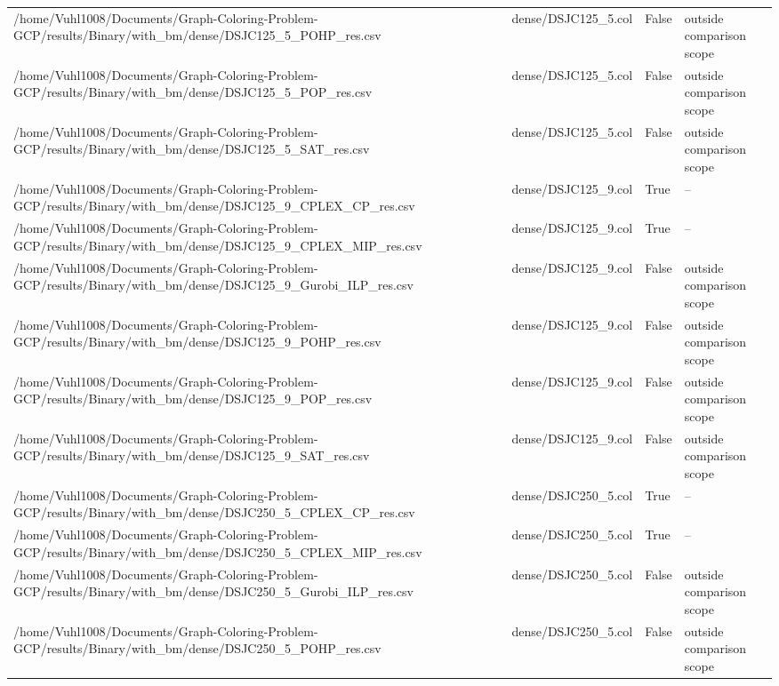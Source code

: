 \begin{table}[htbp]
\begin{tabular}{llll}
/home/Vuhl1008/Documents/Graph-Coloring-Problem-GCP/results/Binary/with\_bm/dense/DSJC125\_5\_POHP\_res.csv & dense/DSJC125\_5.col & False & outside comparison scope \\
/home/Vuhl1008/Documents/Graph-Coloring-Problem-GCP/results/Binary/with\_bm/dense/DSJC125\_5\_POP\_res.csv & dense/DSJC125\_5.col & False & outside comparison scope \\
/home/Vuhl1008/Documents/Graph-Coloring-Problem-GCP/results/Binary/with\_bm/dense/DSJC125\_5\_SAT\_res.csv & dense/DSJC125\_5.col & False & outside comparison scope \\
/home/Vuhl1008/Documents/Graph-Coloring-Problem-GCP/results/Binary/with\_bm/dense/DSJC125\_9\_CPLEX\_CP\_res.csv & dense/DSJC125\_9.col & True & -- \\
/home/Vuhl1008/Documents/Graph-Coloring-Problem-GCP/results/Binary/with\_bm/dense/DSJC125\_9\_CPLEX\_MIP\_res.csv & dense/DSJC125\_9.col & True & -- \\
/home/Vuhl1008/Documents/Graph-Coloring-Problem-GCP/results/Binary/with\_bm/dense/DSJC125\_9\_Gurobi\_ILP\_res.csv & dense/DSJC125\_9.col & False & outside comparison scope \\
/home/Vuhl1008/Documents/Graph-Coloring-Problem-GCP/results/Binary/with\_bm/dense/DSJC125\_9\_POHP\_res.csv & dense/DSJC125\_9.col & False & outside comparison scope \\
/home/Vuhl1008/Documents/Graph-Coloring-Problem-GCP/results/Binary/with\_bm/dense/DSJC125\_9\_POP\_res.csv & dense/DSJC125\_9.col & False & outside comparison scope \\
/home/Vuhl1008/Documents/Graph-Coloring-Problem-GCP/results/Binary/with\_bm/dense/DSJC125\_9\_SAT\_res.csv & dense/DSJC125\_9.col & False & outside comparison scope \\
/home/Vuhl1008/Documents/Graph-Coloring-Problem-GCP/results/Binary/with\_bm/dense/DSJC250\_5\_CPLEX\_CP\_res.csv & dense/DSJC250\_5.col & True & -- \\
/home/Vuhl1008/Documents/Graph-Coloring-Problem-GCP/results/Binary/with\_bm/dense/DSJC250\_5\_CPLEX\_MIP\_res.csv & dense/DSJC250\_5.col & True & -- \\
/home/Vuhl1008/Documents/Graph-Coloring-Problem-GCP/results/Binary/with\_bm/dense/DSJC250\_5\_Gurobi\_ILP\_res.csv & dense/DSJC250\_5.col & False & outside comparison scope \\
/home/Vuhl1008/Documents/Graph-Coloring-Problem-GCP/results/Binary/with\_bm/dense/DSJC250\_5\_POHP\_res.csv & dense/DSJC250\_5.col & False & outside comparison scope \\

\end{tabular}
\end{table}
